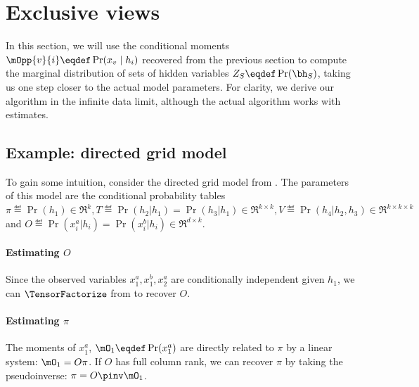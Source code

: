 \section{Exclusive views}
\label{sec:directed}

In this section, we will use the conditional moments $\mOpp{v}{i} \eqdef
\Pr(x_v \mid h_i)$ recovered from the previous section
to compute the marginal distribution of sets of hidden variables $Z_S \eqdef \Pr(\bh_S)$,
taking us one step closer to the actual model parameters.
For clarity, we derive our algorithm in the infinite data limit,
although the actual algorithm works with estimates.

\subsection{Example: directed grid model}
\label{sec:directedExample}

To gain some intuition, consider the directed grid model from .
The parameters of this model are the conditional probability tables
$\pi \eqdef \Pr(h_1) \in \Re^k, T \eqdef \Pr(h_2 | h_1) = \Pr(h_3 | h_1) \in \Re^{k \times k},
V \eqdef \Pr(h_4 | h_2, h_3) \in \Re^{k \times k \times k}$ and $O \eqdef \Pr(x^a_i | h_i)
=  \Pr(x^b_i | h_i) \in \Re^{d \times k}$. 

\paragraph{Estimating $O$}
Since the observed variables $x^a_1, x^b_1, x^a_2$ are
  conditionally independent given $h_1$, we can $\TensorFactorize$ from
   to recover $O$.

\paragraph{Estimating $\pi$}
The moments of $x^a_1$, $\mO_1 \eqdef \Pr(x^a_1)$ are directly related to
  $\pi$ by a linear system: $\mO_1 = O \pi$. 
If $O$ has full column rank, we can recover $\pi$ by taking the pseudoinverse: $\pi = O\pinv  \mO_1$.

